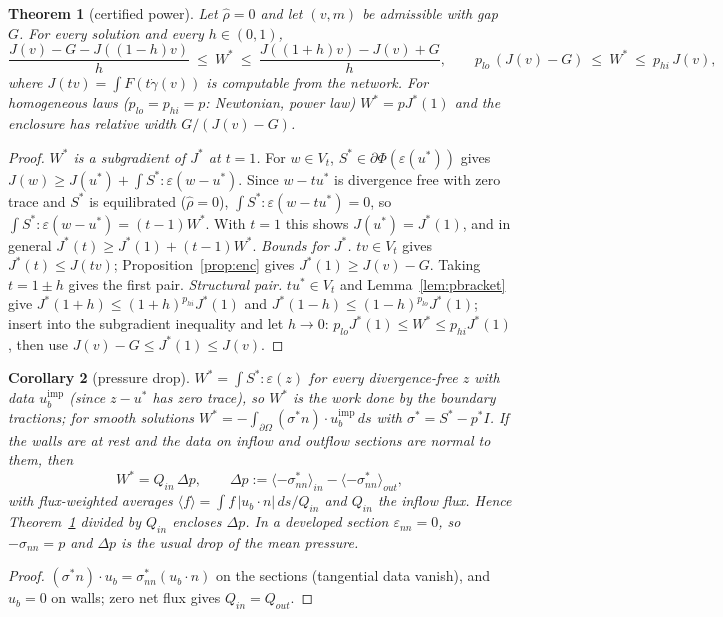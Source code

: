\documentclass[11pt]{article}
\newtheorem{theorem}{Theorem}[section]
\newtheorem{corollary}[theorem]{Corollary}
\theoremstyle{definition}
\newcommand{\eps}{\varepsilon}
\newcommand{\gd}{\dot\gamma}
\begin{document}
\begin{theorem}[certified power]\label{thm:power}
Let $\hat\rho=0$ and let $(v,m)$ be admissible with gap $G$. For every solution and every $h\in(0,1)$,
\[
\frac{J(v)-G-J((1-h)v)}{h}\ \le\ W^*\ \le\ \frac{J((1+h)v)-J(v)+G}{h},
\qquad
p_{lo}\,(J(v)-G)\ \le\ W^*\ \le\ p_{hi}\,J(v),
\]
where $J(tv)=\int F(t\gd(v))$ is computable from the network. For homogeneous laws ($p_{lo}=p_{hi}=p$:
Newtonian, power law) $W^*=pJ^*(1)$ and the enclosure has relative width $G/(J(v)-G)$.
\end{theorem}
\begin{proof}
\emph{$W^*$ is a subgradient of $J^*$ at $t=1$.} For $w\in V_t$, $S^*\in\partial\Phi(\eps(u^*))$ gives
$J(w)\ge J(u^*)+\int S^*:\eps(w-u^*)$. Since $w-tu^*$ is divergence free with zero trace and $S^*$ is equilibrated
($\hat\rho=0$), $\int S^*:\eps(w-tu^*)=0$, so $\int S^*:\eps(w-u^*)=(t-1)W^*$. With $t=1$ this shows $J(u^*)=J^*(1)$, and
in general $J^*(t)\ge J^*(1)+(t-1)W^*$.
\emph{Bounds for $J^*$.} $tv\in V_t$ gives $J^*(t)\le J(tv)$; Proposition~\ref{prop:enc} gives $J^*(1)\ge J(v)-G$. Taking
$t=1\pm h$ gives the first pair.
\emph{Structural pair.} $tu^*\in V_t$ and Lemma~\ref{lem:pbracket} give $J^*(1+h)\le(1+h)^{p_{hi}}J^*(1)$ and
$J^*(1-h)\le(1-h)^{p_{lo}}J^*(1)$; insert into the subgradient inequality and let $h\to0$:
$p_{lo}J^*(1)\le W^*\le p_{hi}J^*(1)$, then use $J(v)-G\le J^*(1)\le J(v)$.
\end{proof}

\begin{corollary}[pressure drop]\label{cor:dp}
$W^*=\int S^*:\eps(z)$ for every divergence-free $z$ with data $u_b^{\mathrm{imp}}$ (since $z-u^*$ has zero trace), so $W^*$ is the
work done by the boundary tractions; for smooth solutions $W^*=-\int_{\partial\Omega}(\sigma^*n)\cdot u_b^{\mathrm{imp}}\,ds$ with
$\sigma^*=S^*-p^*I$. If the walls are at rest and the data on inflow and outflow sections are normal to them, then
\[
W^*=Q_{in}\,\Delta p,\qquad \Delta p:=\langle-\sigma^*_{nn}\rangle_{in}-\langle-\sigma^*_{nn}\rangle_{out},
\]
with flux-weighted averages $\langle f\rangle=\int f\,|u_b\cdot n|\,ds/Q_{in}$ and $Q_{in}$ the inflow flux. Hence
Theorem~\ref{thm:power} divided by $Q_{in}$ encloses $\Delta p$. In a developed section $\eps_{nn}=0$, so $-\sigma_{nn}=p$ and
$\Delta p$ is the usual drop of the mean pressure.
\end{corollary}
\begin{proof}
$(\sigma^*n)\cdot u_b=\sigma^*_{nn}(u_b\cdot n)$ on the sections (tangential data vanish), and $u_b=0$ on walls; zero net flux gives
$Q_{in}=Q_{out}$.
\end{proof}
\end{document}
